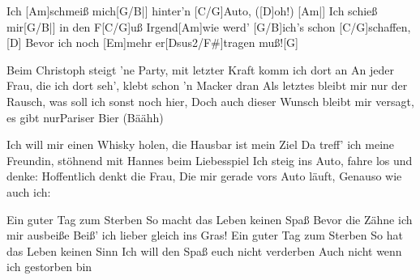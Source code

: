 \begin{guitar}
	 
	
	Ich [Am]schmeiß mich[G/B|] hinter'n [C/G]Auto, ([D]oh!)
	[Am|] Ich schieß mir[G/B|] in den F[C/G]uß
	Irgend[Am]wie werd' [G/B]ich's schon [C/G]schaffen,[D]{}
	Bevor ich noch [Em]mehr er[Dsus2/F#]tragen muß![G]{}
	
	Beim Christoph steigt 'ne Party, mit letzter Kraft komm ich dort an
	An jeder Frau, die ich dort seh', klebt schon 'n Macker dran
	Als letztes bleibt mir nur der Rausch, was soll ich sonst noch hier,
	Doch auch dieser Wunsch bleibt mir versagt, es gibt nurPariser Bier (Bäähh)
	
	Ich will mir einen Whisky holen, die Hausbar ist mein Ziel
	Da treff' ich meine Freundin, stöhnend mit Hannes beim Liebesspiel
	Ich steig ins Auto, fahre los und denke: Hoffentlich denkt die Frau,
	Die mir gerade vors Auto läuft, Genauso wie auch ich:
	
	Ein guter Tag zum Sterben
	So macht das Leben keinen Spaß
	Bevor die Zähne ich mir ausbeiße
	Beiß' ich lieber gleich ins Gras!
	Ein guter Tag zum Sterben
	So hat das Leben keinen Sinn
	Ich will den Spaß euch nicht verderben
	Auch nicht wenn ich gestorben bin
	
\end{guitar}


